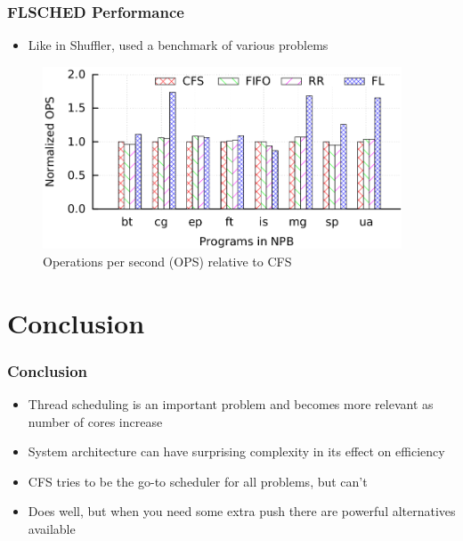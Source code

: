 \documentclass{beamer}
\newcommand{\linespace}{\vskip 0.25cm}
\begin{document}
\begin{frame}
\frametitle{FLSCHED Performance}
\begin{itemize}

\item Like in Shuffler, used a benchmark of various problems

\end{itemize}
\begin{figure}
\caption*{Operations per second (OPS) relative to CFS}
\centering
\includegraphics[width=0.95\textwidth]{Illustrations/FLSCHED_OPS.png}

\end{figure}
\end{frame}

\section[Conclusion]{Conclusion}

\begin{frame}
\frametitle{Conclusion}

\begin{itemize}
\item Thread scheduling is an important problem and becomes more relevant as number of cores increase

\linespace

\item System architecture can have surprising complexity in its effect on efficiency

\linespace

\item CFS tries to be the go-to scheduler for all problems, but can't

\item Does well, but when you need some extra push there are powerful alternatives available

\end{itemize}
\end{frame}
\end{document}
